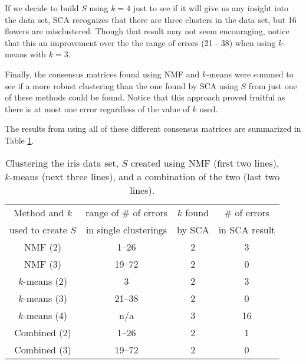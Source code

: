\documentclass[final]{siamltex}
\begin{document}
If we decide to build $S$ using $k=4$ just to see if it will give us any insight into the data set, SCA recognizes that there are three clusters in the data set, but 16 flowers are misclustered. Though that result may not seem encouraging, notice that this an improvement over the the range of errors (21 - 38) when using $k$-means with $k=3$. 

Finally, the consensus matrices found using NMF and $k$-means were summed to see if a more robust clustering than the one found by SCA using $S$ from just one of these methods could be found. Notice that this approach proved fruitful as there is at most one error regardless of the value of $k$ used.

The results from using all of these different consensus matrices are summarized in Table \ref{irisresults1}.

\begin{table}[h!]
\centering
\caption{\noindent Clustering the iris data set, $S$ created using NMF (first two lines), $k$-means (next three lines), and a combination of the two (last two lines).} 
\begin{tabular}{c | c | c | c}
Method and $k$  & range of \#  of errors &      $k$ found & \# of errors    \\ 
  used  to create $S$    & in single clusterings & by SCA & in SCA result \\ \hline \hline
NMF (2) & 1--26 & 2 & 3  \\
NMF (3) & 19--72 & 2 & 0    \\ \hline 
$k$-means (2) & 3 & 2 & 3  \\
$k$-means (3) & 21--38 & 2 & 0   \\
$k$-means (4) & n/a & 3 & 16  \\ \hline 
Combined (2) & 1--26 & 2  & 1   \\ 
Combined (3) & 19--72 & 2  & 0   \\ 
\end{tabular}
\label{irisresults1}
\end{table}  
\end{document}
